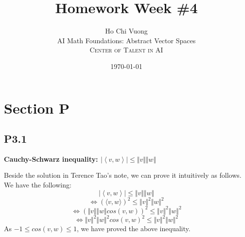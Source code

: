 \documentclass[12pt]{article}
\title{Homework Week \#4} %
\author{Ho Chi Vuong\\ %
AI Math Foundations: Abstract Vector Spaces\\ %
\textsc{Center of Talent in AI}
}
\date{\today} %
\begin{document}
   
\maketitle


\section*{Section P}


\subsection*{P3.1}
\textbf{Cauchy-Schwarz inequality: $|\left \langle v,w \right \rangle| \leq \Vert v\Vert\Vert w\Vert$}

Beside the solution in Terence Tao's note, we can prove it intuitively as follows. We have the following:
$$|\left \langle v,w \right \rangle| \leq \Vert v\Vert\Vert w\Vert$$
$$\Leftrightarrow (\langle v,w \rangle)^2 \leq \Vert v\Vert^2\Vert w\Vert^2$$
$$\Leftrightarrow (\Vert v\Vert\Vert w\Vert cos(v,w))^2 \leq \Vert v\Vert^2\Vert w\Vert^2$$
$$\Leftrightarrow \Vert v\Vert^2\Vert w\Vert^2 cos(v,w)^2 \leq \Vert v\Vert^2\Vert w\Vert^2$$
As $-1 \leq cos(v,w) \leq 1$, we have proved the above inequality.


\end{document}
